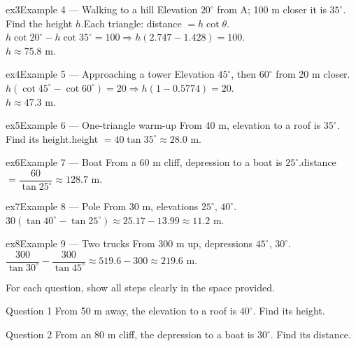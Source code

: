\documentclass[11pt]{article}
\begin{document}
\begin{example}{ex3}{Example 4 --- Walking to a hill}
Elevation $20^\circ$ from A; 100 m closer it is $35^\circ$. Find the height $h$.\soln Each triangle: distance $=h\cot\theta$. \\ $h\cot20^\circ-h\cot35^\circ=100\Rightarrow h(2.747-1.428)=100$. \\ $h\approx75.8$ m.
\end{example}

\begin{example}{ex4}{Example 5 --- Approaching a tower}
Elevation $45^\circ$, then $60^\circ$ from 20 m closer.\soln $h(\cot45^\circ-\cot60^\circ)=20\Rightarrow h(1-0.5774)=20$. \\ $h\approx47.3$ m.
\end{example}

\begin{example}{ex5}{Example 6 --- One-triangle warm-up}
From 40 m, elevation to a roof is $35^\circ$. Find its height.\soln height $=40\tan35^\circ\approx28.0$ m.
\end{example}

\begin{example}{ex6}{Example 7 --- Boat}
From a 60 m cliff, depression to a boat is $25^\circ$.\soln distance $=\dfrac{60}{\tan25^\circ}\approx128.7$ m.
\end{example}

\begin{example}{ex7}{Example 8 --- Pole}
From 30 m, elevations $25^\circ$, $40^\circ$.\soln $30(\tan40^\circ-\tan25^\circ)\approx25.17-13.99\approx11.2$ m.
\end{example}

\begin{example}{ex8}{Example 9 --- Two trucks}
From 300 m up, depressions $45^\circ$, $30^\circ$.\soln $\dfrac{300}{\tan30^\circ}-\dfrac{300}{\tan45^\circ}\approx519.6-300\approx219.6$ m.
\end{example}

\clearpage
{}
For each question, show all steps clearly in the space provided.

\begin{qbox}{Question 1}
From 50 m away, the elevation to a roof is $40^\circ$. Find its height.\workspace{2.4cm}
\end{qbox}

\begin{qbox}{Question 2}
From an 80 m cliff, the depression to a boat is $30^\circ$. Find its distance.\workspace{2.4cm}
\end{qbox}
\end{document}
